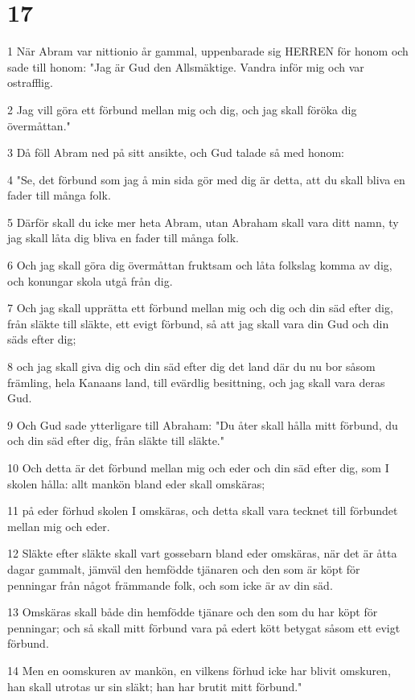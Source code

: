 \chapter{17}

\par 1 När Abram var nittionio år gammal, uppenbarade sig HERREN för honom och sade till honom: "Jag är Gud den Allsmäktige. Vandra inför mig och var ostrafflig.
\par 2 Jag vill göra ett förbund mellan mig och dig, och jag skall föröka dig övermåttan."
\par 3 Då föll Abram ned på sitt ansikte, och Gud talade så med honom:
\par 4 "Se, det förbund som jag å min sida gör med dig är detta, att du skall bliva en fader till många folk.
\par 5 Därför skall du icke mer heta Abram, utan Abraham skall vara ditt namn, ty jag skall låta dig bliva en fader till många folk.
\par 6 Och jag skall göra dig övermåttan fruktsam och låta folkslag komma av dig, och konungar skola utgå från dig.
\par 7 Och jag skall upprätta ett förbund mellan mig och dig och din säd efter dig, från släkte till släkte, ett evigt förbund, så att jag skall vara din Gud och din säds efter dig;
\par 8 och jag skall giva dig och din säd efter dig det land där du nu bor såsom främling, hela Kanaans land, till evärdlig besittning, och jag skall vara deras Gud.
\par 9 Och Gud sade ytterligare till Abraham: "Du åter skall hålla mitt förbund, du och din säd efter dig, från släkte till släkte."
\par 10 Och detta är det förbund mellan mig och eder och din säd efter dig, som I skolen hålla: allt mankön bland eder skall omskäras;
\par 11 på eder förhud skolen I omskäras, och detta skall vara tecknet till förbundet mellan mig och eder.
\par 12 Släkte efter släkte skall vart gossebarn bland eder omskäras, när det är åtta dagar gammalt, jämväl den hemfödde tjänaren och den som är köpt för penningar från något främmande folk, och som icke är av din säd.
\par 13 Omskäras skall både din hemfödde tjänare och den som du har köpt för penningar; och så skall mitt förbund vara på edert kött betygat såsom ett evigt förbund.
\par 14 Men en oomskuren av mankön, en vilkens förhud icke har blivit omskuren, han skall utrotas ur sin släkt; han har brutit mitt förbund."
